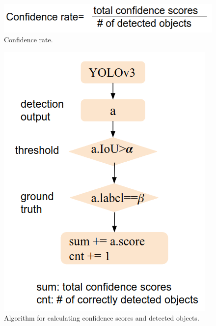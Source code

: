 \begin{figure}
	\centering
	\includegraphics[width=0.7\linewidth]{figure/confidence.png}
	\caption{Confidence rate.}
	\label{fig:conf}
\end{figure}
%
\begin{figure}
	\centering
	\includegraphics[width=0.5\linewidth]{figure/algorithm.png}
	\caption{Algorithm for calculating confidence scores and detected objects.}
	\label{fig:algo}
\end{figure}


